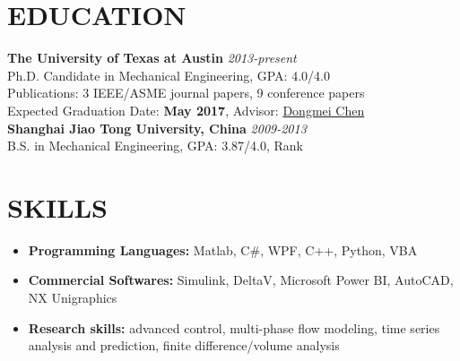 \documentclass[margin, 9pt]{res} %
\begin{document}
\begin{resume}


\vspace*{-5pt}

\vspace*{-10pt}
\section{EDUCATION}

\textbf{The University of Texas at Austin} \hfill\textit{2013-present} \\
Ph.D. Candidate in Mechanical Engineering, GPA: 4.0/4.0 \\
Publications: 3 IEEE/ASME journal papers,  9 conference papers \\
Expected Graduation Date: \textbf{May 2017},  Advisor: \href{http://www.me.utexas.edu/~apscl/people.html}{Dongmei Chen}\\

\vspace*{-10pt}
\textbf{Shanghai Jiao Tong University, China} \hfill\textit{2009-2013}\\
B.S. in Mechanical Engineering, GPA: 3.87/4.0, Rank\\

\vspace*{-10pt}
\section{SKILLS}

\vspace*{-2pt}
\begin{itemize}[leftmargin=*] \itemsep -4pt
	\item {\bf Programming Languages:} Matlab, C\#, WPF,  C++, Python, VBA
	\item {\bf Commercial Softwares:} Simulink, DeltaV, Microsoft Power BI, AutoCAD, NX Unigraphics
	\item {\bf Research skills:} advanced control, multi-phase flow modeling, time series analysis and prediction, finite difference/volume analysis
\end{itemize}


\end{resume}
\end{document}
